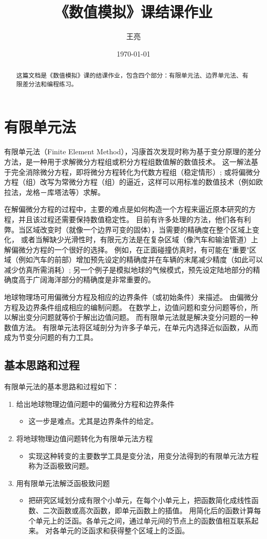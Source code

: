 \documentclass[hyperref,UTF-8]{ctexart}
\title{\heiti 《数值模拟》课结课作业}
\author{\kaishu 王亮}
\date{\today}
\begin{document}
\maketitle
\tableofcontents
\begin{abstract}
这篇文档是《数值模拟》课的结课作业，包含四个部分：有限单元法、边界单元法、有限差分法和编程练习。
\end{abstract}
\section{有限单元法}
有限单元法（Finite Element Method），冯康首次发现时称为基于变分原理的差分方法，是一种用于求解微分方程组或积分方程组数值解的数值技术。
这一解法基于完全消除微分方程，即将微分方程转化为代数方程组（稳定情形）;
或将偏微分方程（组）改写为常微分方程（组）的逼近，这样可以用标准的数值技术（例如欧拉法，龙格－库塔法等）求解。

在解偏微分方程的过程中，主要的难点是如何构造一个方程来逼近原本研究的方程，并且该过程还需要保持数值稳定性。
目前有许多处理的方法，他们各有利弊。当区域改变时（就像一个边界可变的固体），当需要的精确度在整个区域上变化，
或者当解缺少光滑性时，有限元方法是在复杂区域（像汽车和输油管道）上解偏微分方程的一个很好的选择。
例如，在正面碰撞仿真时，有可能在"重要"区域（例如汽车的前部）增加预先设定的精确度并在车辆的末尾减少精度（如此可以减少仿真所需消耗）;
另一个例子是模拟地球的气候模式，预先设定陆地部分的精确度高于广阔海洋部分的精确度是非常重要的。

地球物理场可用偏微分方程及相应的边界条件（或初始条件）来描述。
由偏微分方程及边界条件组成相应的编制问题。
在数学上，边值问题和变分问题等价，所以解出变分问题就等价于解出边值问题。
而有限单元法就是解决变分问题的一种数值方法。
有限单元法将区域剖分为许多子单元，在单元内选择近似函数，从而成为节变分问题的有力工具。
\subsection{基本思路和过程}
有限单元法的基本思路和过程如下：
\begin{enumerate}
\item 给出地球物理边值问题中的偏微分方程和边界条件
\begin{itemize}
\item 这一步是难点。尤其是边界条件的给定。
\end{itemize}
\item 将地球物理边值问题转化为有限单元法方程
\begin{itemize}
\item 实现这种转变的主要数学工具是变分法，用变分法得到的有限单元法方程称为泛函极致问题。
\end{itemize}
\item 用有限单元法解泛函极致问题
\begin{itemize}
\item 把研究区域划分成有限个小单元，在每个小单元上，把函数简化成线性函数、二次函数或高次函数，即单元函数上的插值。
用简化后的函数计算每个单元上的泛函。各单元之间，通过单元间的节点上的函数值相互联系起来。
对各单元的泛函求和获得整个区域上的泛函。
\end{itemize}
\end{enumerate}
\end{document}
